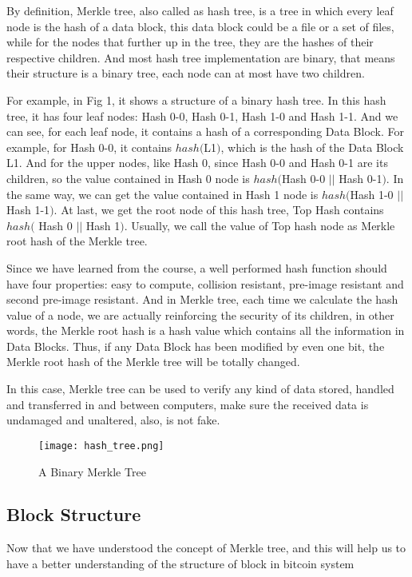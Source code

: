 \documentclass[12pt,a4paper]{article}
\begin{document}
By definition, Merkle tree, also called as hash tree, is a tree in which every leaf node is the hash of a data block, this data block could be a file or a set of files, while for the nodes that further up in the tree, they are the hashes of their respective children. And most hash tree implementation are binary, that means their structure is a binary tree, each node can at most have two children.

For example, in Fig 1, it shows a structure of a binary hash tree. In this hash tree, it has four leaf nodes: Hash 0-0, Hash 0-1, Hash 1-0 and Hash 1-1. And we can see, for each leaf node, it contains a hash of a corresponding Data Block. For example, for Hash 0-0, it contains $hash($L1$)$, which is the hash of the Data Block L1. And for the upper nodes, like Hash 0, since Hash 0-0 and Hash 0-1 are its children, so the value contained in Hash 0 node is $hash($Hash 0-0 $||$ Hash 0-1$)$. In the same way, we can get the value contained in Hash 1 node is $hash($Hash 1-0 $||$ Hash 1-1$)$. At last, we get the root node of this hash tree, Top Hash contains $hash($ Hash 0 $||$ Hash 1$)$. Usually, we call the value of Top hash node as Merkle root hash of the Merkle tree.

Since we have learned from the course, a well performed hash function should have four properties: easy to compute, collision resistant, pre-image resistant and second pre-image resistant. And in Merkle tree, each time we calculate the hash value of a node, we are actually reinforcing the security of its children, in other words, the Merkle root hash is a hash value which contains all the information in Data Blocks. Thus, if any Data Block has been modified by even one bit, the Merkle root hash of the Merkle tree will be totally changed.

In this case, Merkle tree can be used to verify any kind of data stored, handled and transferred in and between computers, make sure the received data is undamaged and unaltered, also, is not fake.

\begin{figure}[htbp!]
	\centering
	\texttt{[image: hash\_tree.png]}
	\caption{A Binary Merkle Tree}
	\label{fig::diagram}
\end{figure}

\subsection{Block Structure}
Now that we have understood the concept of Merkle tree, and this will help us to have a better understanding of the structure of block in bitcoin system
\end{document}
